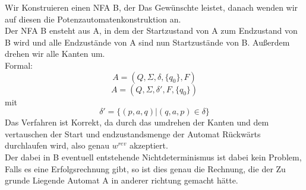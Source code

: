 Wir Konstruieren einen NFA B, der Das Gewünschte leistet, danach wenden wir auf diesen die Potenzautomatenkonstruktion an.\\
Der NFA B ensteht aus A, in dem der Startzustand von A zum Endzustand von B wird und alle Endzustände von A sind nun Startzustände von B. Außerdem drehen wir alle Kanten um.\\
Formal:\\
\[A=(Q,\Sigma,\delta,\{q_0\},F)\]
\[A=(Q,\Sigma,\delta',F,\{q_0\})\]
mit \[\delta' = \{(p,a,q)|(q,a,p)\in \delta\}\]
Das Verfahren ist Korrekt, da durch das umdrehen der Kanten und dem vertauschen der Start und endzustandsmenge der Automat Rückwärts durchlaufen wird, also genau $w^{rev}$ akzeptiert.\\
Der dabei in B eventuell entstehende Nichtdeterminismus ist dabei kein Problem, Falls es eine Erfolgsrechnung gibt, so ist dies genau die Rechnung, die der Zu grunde Liegende Automat A in anderer richtung gemacht hätte.